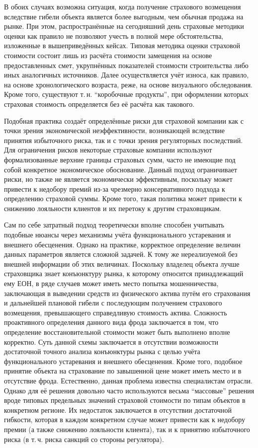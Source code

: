 \documentclass[12pt]{scrartcl}
\begin{document}
В обоих случаях возможна ситуация, когда получение страхового возмещения вследствие гибели объекта является более выгодным, чем обычная продажа на рынке. При этом, распространённые на сегодняшний день страховые методики оценки как правило не позволяют учесть в полной мере обстоятельства, изложенные в вышеприведённых кейсах. Типовая методика оценки страховой стоимости состоит лишь из расчёта стоимости замещения на основе предоставленных смет, укрупнённых показателей стоимости строительства либо иных аналогичных источников. Далее осуществляется учёт износа, как правило, на основе хронологического возраста, реже, на основе визуального обследования. Кроме того, существуют т.\,н. ``коробочные продукты'', при оформлении которых страховая стоимость определяется без её расчёта как такового.

Подобная практика создаёт определённые риски для страховой компании как с точки зрения экономической неэффективности, возникающей вследствие принятия избыточного риска, так и с точки зрения регуляторных последствий. Для ограничения рисков некоторые страховые компании используют формализованные верхние границы страховых сумм, часто не имеющие под собой конкретное экономическое обоснование. Данный подход ограничивает риски, но также не является экономически эффективным, поскольку может привести к недобору премий из-за чрезмерно консервативного подхода к определению страховой суммы. Кроме того, такая политика может привести к снижению лояльности клиентов и их перетоку к другим страховщикам.

Сам по себе затратный подход теоретически вполне способен учитывать подобные нюансы через механизмы учёта функционального устаревания и внешнего обесценения. Однако на практике, корректное определение величин данных параметров является сложной задачей. К тому же нереализуемой без внешней информации об этих величинах. Поскольку владелец объекта лучше страховщика знает конъюнктуру рынка, к которому относится принадлежащий ему ЕОН, в ряде случаев может иметь место попытка мошенничества, заключающая в выведении средств из физического актива путём его страхования и дальнейшей плановой гибели с последующим получением страхового возмещения, превышающего справедливую стоимость актива. Сложность проактивного определения данного вида фрода заключается в том, что определение восстановительной стоимости может быть выполнено вполне корректно. Суть данной схемы заключается в отсутствии возможности достаточной точного анализа конъюнктуры рынка с целью учёта функционального устаревания и внешнего обесценения. Кроме того, подобное принятие объекта на страхование по завышенной цене может иметь место и в отсутствие фрода. Естественно, данная проблема известна специалистам отрасли. Однако для её решения довольно часто используются весьма ``массовые'' решения вроде типовых предельных значений страховой стоимости по типам объектов в конкретном регионе. Их недостаток заключается в отсутствии достаточной гибкости, которая в каждом конкретном случае может привести как к недобору премии (а также снижению лояльности клиента), так и к принятию избыточного риска (в т.\,ч. риска санкций со стороны регулятора).
\end{document}
